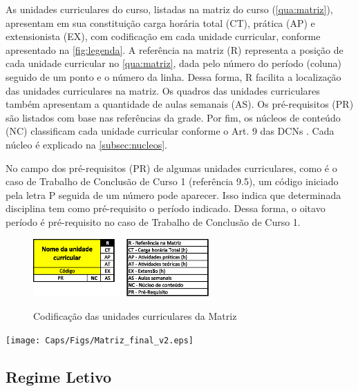 As unidades curriculares do curso, listadas na matriz do curso (\autoref{qua:matriz}), apresentam em sua constituição carga horária total (CT), prática (AP) e extensionista (EX), com codificação em cada unidade curricular, conforme apresentado na \autoref{fig:legenda}. A referência na matriz (R) representa a posição de cada unidade curricular no \autoref{qua:matriz}, dada pelo número do período (coluna) seguido de um ponto e o número da linha. Dessa forma, R facilita a localização das unidades curriculares na matriz. Os quadros das unidades curriculares também apresentam a quantidade de aulas semanais (AS). Os pré-requisitos (PR) são listados com base nas referências da grade. Por fim, os núcleos de conteúdo (NC) classificam cada unidade curricular conforme o Art. 9\textordmasculine{} das DCNs \cite{dcneng}. Cada núcleo é explicado na \autoref{subsec:nucleos}.

No campo dos pré-requisitos (PR) de algumas unidades curriculares, como é o caso de Trabalho de Conclusão de Curso 1 (referência 9.5), um código iniciado pela letra P seguida de um número pode aparecer. Isso indica que determinada disciplina tem como pré-requisito o período indicado. Dessa forma, o oitavo período é pré-requisito no caso de Trabalho de Conclusão de Curso 1.

\begin{figure}[hbt!]
	\centering
	\caption{Codificação das unidades curriculares da Matriz}
	\includegraphics[width=0.6\textwidth]{Caps/Figs/Matriz_final_v2_leg2.eps}
	\fonte{\utf}
	\label{fig:legenda}
\end{figure}

\begin{landscape}
	\begin{quadro}
		\centering
		\caption{Matriz do Curso de Engenharia Eletrônica}
		\texttt{[image: Caps/Figs/Matriz\_final\_v2.eps]}
		\fonte{\utf}
		\label{qua:matriz}
	\end{quadro}
\end{landscape}
\restoregeometry



\subsection{Regime Letivo}
\label{sub:reg}

